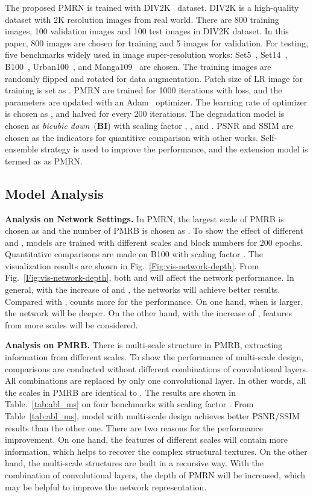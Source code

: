 \documentclass[journal]{IEEEtran}
\begin{document}
The proposed PMRN is trained with DIV2K~\cite{timofte2017ntire} dataset. DIV2K is a high-quality dataset with 2K resolution images from real world. There are 800 training images, 100 validation images and 100 test images in DIV2K dataset. In this paper, 800 images are chosen for training and 5 images for validation. For testing, five benchmarks widely used in image super-resolution works: Set5~\cite{set5}, Set14~\cite{set14}, B100~\cite{b100}, Urban100~\cite{urban100}, and Manga109~\cite{manga109} are chosen. The training images are randomly flipped and rotated for data augmentation. Patch size of LR image for training is set as . PMRN are trained for 1000 iterations with  loss, and the parameters are updated with an Adam~\cite{adam} optimizer. The learning rate of optimizer is chosen as , and halved for every 200 iterations. The degradation model is chosen as \textit{bicubic down}~(\textbf{BI}) with scaling factor , , and . PSNR and SSIM are chosen as the indicators for quantitive comparison with other works. Self-ensemble strategy is used to improve the performance, and the extension model is termed as as PMRN.




\subsection{Model Analysis}
\textbf{Analysis on Network Settings.}
In PMRN, the largest scale of PMRB is chosen as  and the number of PMRB is chosen as . To show the effect of different  and , models are trained with different scales and block numbers for 200 epochs. Quantitative comparisons are made on B100 with scaling factor . The visualization results are shown in Fig.~\ref{Fig:vis-network-depth}. From Fig.~\ref{Fig:vis-network-depth}, both  and  will affect the network performance. In general, with the increase of  and , the networks will achieve better results. Compared with ,  counts more for the performance. On one hand, when  is larger, the network will be deeper. On the other hand, with the increase of , features from more scales will be considered.



\textbf{Analysis on PMRB.}
There is multi-scale structure in PMRB, extracting information from different scales. To show the performance of multi-scale design, comparisons are conducted without different combinations of convolutional layers. All combinations are replaced by only one  convolutional layer. In other words, all the scales in PMRB are identical to . The results are shown in Table.~\ref{tab:abl_ms} on four benchmarks with scaling factor .
From Table~\ref{tab:abl_ms}, model with multi-scale design achieves better PSNR/SSIM results than the other one. There are two reasons for the performance improvement. On one hand, the features of different scales will contain more information, which helps to recover the complex structural textures. On the other hand, the multi-scale structures are built in a recursive way. With the combination of convolutional layers, the depth of PMRN will be increased, which may be helpful to improve the network representation.
\end{document}
